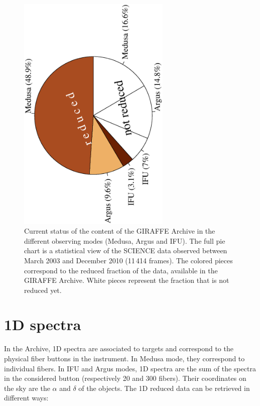 \begin{figure}[!ht]
\begin{center}
    \includegraphics[angle=-90,width=0.65\textwidth]{part6/Royer_P63/P63_f1.eps}
\end{center}
\caption{Current status of the content of the GIRAFFE Archive in the different observing modes (Medusa, Argus and IFU). The full pie chart is a statistical view of the SCIENCE data observed between March 2003 and December 2010 (11\,414 frames). The colored pieces correspond to the reduced fraction of the data, available in the GIRAFFE Archive. White pieces represent the fraction that is not reduced yet.
}
\label{camembert}
\end{figure}


\section{1D spectra}

In the Archive, 1D spectra are associated to targets and correspond to the physical fiber buttons in the instrument. In Medusa mode, they correspond to individual fibers. In IFU and Argus modes, 1D spectra are the sum of the spectra in the considered button (respectively 20 and 300 fibers). Their coordinates on the sky are the $\alpha$ and $\delta$ of the objects. The 1D reduced data can be retrieved in different ways:
